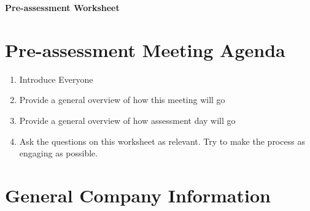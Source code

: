 \documentclass[./main.tex]{subfiles}
\begin{document}
\begin{center}
\Large\textbf{Pre-assessment Worksheet}
\end{center}



\section*{Pre-assessment Meeting Agenda}

\begin{enumerate}
    \item Introduce Everyone
    \item Provide a general overview of how this meeting will go
    \item Provide a general overview of how assessment day will go
    \item Ask the questions on this worksheet as relevant. Try to make the process as engaging as possible.
\end{enumerate}

\section*{General Company Information}
\end{document}
